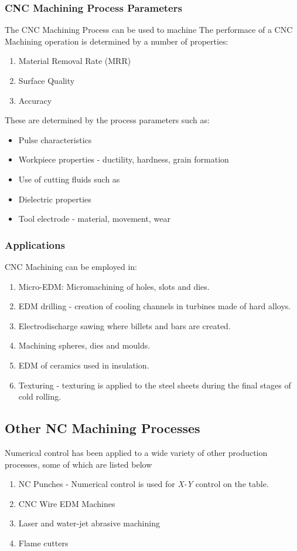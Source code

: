 \subsubsection{CNC Machining Process Parameters}
The CNC Machining Process can be used to machine
The performace of a CNC Machining operation is determined by a number of properties:
\begin{enumerate}
	\item Material Removal Rate (MRR)
	\item Surface Quality
	\item Accuracy
\end{enumerate}
These are determined by the process parameters such as:
\begin{itemize}
	\item Pulse characteristics
	\item Workpiece properties - ductility, hardness, grain formation
	\item Use of cutting fluids such as 
	\item Dielectric properties
	\item Tool electrode - material, movement, wear
\end{itemize}

\subsubsection{Applications}
CNC Machining can be employed in:
\begin{enumerate}
	\item Micro-EDM: Micromachining of holes, slots and dies.
	\item EDM drilling - creation of cooling channels in turbines made of hard alloys.
	\item Electrodischarge sawing where billets and bars are created.
	\item Machining spheres, dies and moulds.
	\item EDM of ceramics used in insulation.
	\item Texturing - texturing is applied to the steel sheets during the final stages of cold rolling.
\end{enumerate}
\subsection{Other NC Machining Processes}
Numerical control has been applied to a wide variety of other production processes\cite{Black2011}, some of which are listed below
\begin{enumerate}
	\item NC Punches - Numerical control is used for \textit{X-Y} control on the table.
	\item CNC Wire EDM Machines
	\item Laser and water-jet abrasive machining
	\item Flame cutters
\end{enumerate}
